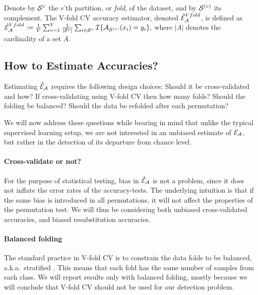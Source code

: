 \documentclass[]{bio}
\begin{document}
\begin{definition}
	\label{def:v-fold}
	Denote by $\mathcal{S}^{v}$ the $v$'th partition, or \emph{fold}, of the dataset, and by $\mathcal{S}^{(v)}$ its complement.
	The V-fold CV accuracy estimator, denoted $\hat{\mathcal{E}}_{\mathcal{A}}^{Vfold}$, is defined as 	
	$\hat{\mathcal{E}}_{\mathcal{A}}^{Vfold} := 
	\frac 1V \sum_{v=1}^{V} \frac{1}{|\mathcal{S}^v|} \sum_{i \in \mathcal{S}^{v}} \mathcal{I}{\{ \mathcal{A}_{\mathcal{S}^{(v)}}(x_i)=y_i \}},$
	where $|A|$ denotes the cardinality of a set $A$.
\end{definition}




\subsection{How to Estimate Accuracies?}
\label{sec:considerations}

Estimating $\hat{\mathcal{E}}_{\mathcal{A}}$ requires the following design choices: 
Should it be cross-validated and how? 
If cross-validating using V-fold CV then how many folds? 
Should the folding be balanced?
Should the data be refolded after each permutation? 

We will now address these questions while bearing in mind that unlike the typical supervised learning setup, we are not interested in an unbiased estimate of $\mathcal{E}_{\mathcal{A}}$, but rather in the detection of its departure from chance level. 

\paragraph{Cross-validate or not?}
For the purpose of statistical testing, bias in $\hat{\mathcal{E}}_{\mathcal{A}}$ is not a problem, since  it does not inflate the error rates of the accuracy-tests. 
The underlying intuition is that if the same bias is introduced in all permutations, it will not affect the properties of the permutation test. 
We will thus be considering both unbiased cross-validated accuracies, and biased resubstitution accuracies.


\paragraph{Balanced folding}
The standard practice in V-fold CV is to constrain the data folds to be balanced, a.k.a.\ stratified \cite[for example]{ojala_permutation_2010}.
This means that each fold has the same number of samples from each class. 
We will report results only with balanced folding, mostly because we will conclude that V-fold CV should not be used for our detection problem. 
\end{document}
